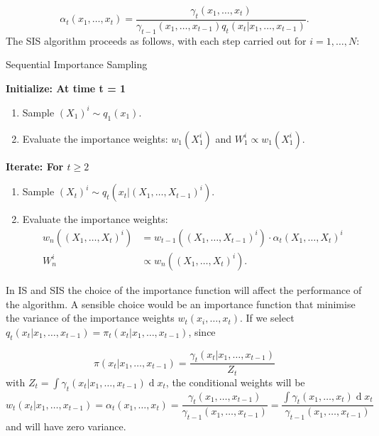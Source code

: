 \documentclass[11pt,a4paper]{article}
\renewcommand{\d}[1]{\ensuremath{\operatorname{d}\!{#1}}}
\begin{document}
\begin{equation*}
    \alpha_t (x_1, \dots, x_t) = \frac{\gamma_t (x_1, \dots, x_t)}{\gamma_{t-1} (x_1, \dots, x_{t-1}) q_t(x_t | x_1, \dots, x_{t-1})}.
\end{equation*}
The SIS algorithm proceeds as follows, with each step carried out for $i = 1, \dots, N$:

\begin{algorithm}[H]
\caption{Sequential Importance Sampling}\label{SIS}
    \begin{algorithmic}
        \State  \bf{Initialize:} \normalfont At time t = 1
            \begin{enumerate}
	            \item Sample $(X_{1})^i \sim q_1(x_1)$.
	            \item Evaluate the importance weights: $w_1(X_1^i)$ and $W^i_1 \propto w_1(X_1^i)$.
            \end{enumerate}
        \State  \bf{Iterate:} \normalfont For $t \geq 2$
            \begin{enumerate}
	            \item Sample $(X_{t})^i \sim q_t(x_t | (X_1, \dots, X_{t-1})^i)$.
	            \item Evaluate the importance weights: 
	                \begin{align*}
	                    w_n((X_1, \dots, X_t)^i) & = w_{t-1}((X_1, \dots, X_{t-1})^i) \cdot \alpha_t (X_1, \dots, X_t)^i \\ 
	                    W^i_n & \propto w_n((X_1, \dots, X_t)^i).
	                \end{align*}
	        \end{enumerate}
    \end{algorithmic}
\end{algorithm}

In IS and SIS the choice of the importance function will affect the performance of the algorithm. A sensible choice would be an importance function that minimise the variance of the importance weights $w_t(x_i, \dots, x_t)$. If we select $q_t(x_t | x_1, \dots, x_{t-1}) = \pi_t(x_t | x_1, \dots, x_{t-1})$, since 

\begin{equation*}
    \pi(x_t | x_1, \dots, x_{t-1}) = \frac{\gamma_t(x_t | x_1, \dots, x_{t-1})}{Z_t}
\end{equation*}
with ${Z_t} = \int \gamma_t(x_t | x_1, \dots, x_{t-1}) \d x_t$, the conditional weights will be
\begin{equation*}
    w_t(x_t | x_1, \dots, x_{t-1}) = \alpha_t(x_1, \dots, x_t) = \frac{\gamma_t(x_1, \dots, x_{t-1})}{\gamma_{t-1}(x_1, \dots, x_{t-1})} = \frac{\int \gamma_t(x_1, \dots, x_t) \d x_t}{\gamma_{t-1}(x_1, \dots, x_{t-1})}
\end{equation*}
and will have zero variance.
\end{document}
